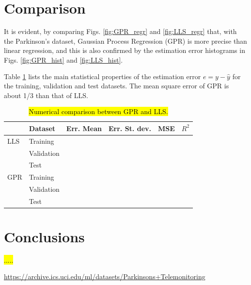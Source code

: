 \documentclass[12pt]{article}
\begin{document}
\section{Comparison}

It is evident, by comparing Figs. \ref{fig:GPR_regr} and \ref{fig:LLS_regr} that, with the Parkinson's dataset, Gaussian Process Regression (GPR) is more precise than linear regression, and this is also confirmed by the estimation error histograms in Figs. \ref{fig:GPR_hist} and \ref{fig:LLS_hist}. 

Table \ref{ta:res} lists the main statistical properties of the estimation error $e=y-\hat{y}$ for the training, validation and test datasets.
The mean square error of GPR is about 1/3 than that of LLS. 

\begin{table}[h]
    \centering
    \begin{tabular}{|l|l|c|c|c|c|}
    \hline
&  Dataset      & Err. Mean & Err. St. dev. & MSE & $R^2$\\
\hline
LLS &Training   &   &  &  & \\
    &Validation &   &  &  & \\
    &Test       &   &  &  & \\
\hline
GPR &Training    &   &  &  & \\
    &Validation &   &  &  & \\
    &Test       &   &  &  & \\
\hline
    \end{tabular}
    \caption{\hl{Numerical comparison between GPR and LLS.}}
    \label{ta:res}
\end{table}

\section{Conclusions}
\hl{.....}
\begin{thebibliography}{9}
 \url{https://archive.ics.uci.edu/ml/datasets/Parkinsons+Telemonitoring}

\end{thebibliography}
\end{document}
